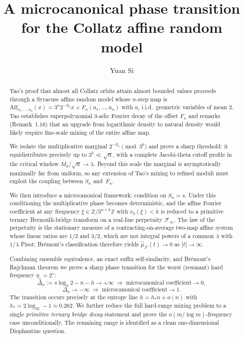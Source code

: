 \documentclass[11pt,a4paper]{amsart}
\title{A microcanonical phase transition for the Collatz affine random model}
\author{Yuan Si}
\date{}
\theoremstyle{plain}
\theoremstyle{definition}
\newcommand{\Z}{\mathbb{Z}}
\newcommand{\Aff}{\mathrm{Aff}}
\begin{document}
\begin{abstract}
Tao's proof that almost all Collatz orbits attain almost bounded values
proceeds through a Syracuse affine random model whose $n$-step map is
$\Aff_{a_1,\dots,a_n}(x)=3^n2^{-S_n}x+F_n(a_1,\dots,a_n)$
with $a_i$ i.i.d.\ geometric variables of mean $2$.
Tao establishes superpolynomial $3$-adic Fourier decay of the offset $F_n$
and remarks (Remark~1.16) that an upgrade from logarithmic density to natural
density would likely require fine-scale mixing of the entire affine map.

We isolate the multiplicative marginal $2^{-S_n}\pmod{3^k}$ and prove a sharp
threshold: it equidistributes precisely up to $3^k\ll\sqrt{n}$, with a
complete Jacobi-theta cutoff profile in the critical window
$M_k/\sqrt n\to\lambda$.
Beyond this scale the marginal is asymptotically maximally far from uniform,
so any extension of Tao's mixing to refined moduli must exploit the coupling
between $S_n$ and~$F_n$.

We then introduce a microcanonical framework: condition on $S_n=s$.
Under this conditioning the multiplicative phase becomes deterministic, and
the affine Fourier coefficient at any frequency $\xi\in\Z/3^{n+k}\Z$ with
$v_3(\xi)<k$ is reduced to a primitive ternary Bernoulli-bridge transform on
a real-line perpetuity $\mathcal F_\infty$.
The law of the perpetuity is the stationary measure of a contracting-on-average
two-map affine system whose linear ratios are $1/2$ and $3/2$, which are
not integral powers of a common $\lambda$ with $1/\lambda$ Pisot;
Br\'emont's classification therefore yields
$\widehat{\mu}_{\mathcal F}(t)\to0$ as $|t|\to\infty$.

Combining ensemble equivalence, an exact suffix self-similarity, and Br\'emont's
Rajchman theorem we prove a sharp phase transition for the worst (resonant)
hard frequency $\eta_s=2^s$:
$$
\Delta_n:=s\log_3 2-n-h\to+\infty
\;\Longrightarrow\;\text{microcanonical coefficient}\to0,
$$
$$
\Delta_n\to-\infty
\;\Longrightarrow\;\text{microcanonical coefficient}\to1.
$$
The transition occurs precisely at the entropy line
$h=h_\ast n+o(n)$ with $h_\ast=2\log_32-1\approx 0.262$.
We further reduce the full hard-range mixing problem to a single
\emph{primitive ternary bridge decay} statement and prove the
$o(m/\log m)$-frequency case unconditionally.
The remaining range is identified as a clean one-dimensional
Diophantine question.
\end{abstract}

\maketitle
\end{document}
